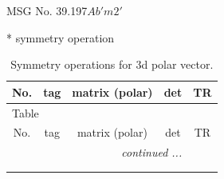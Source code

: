 \documentclass[fleqn,8pt]{jsarticle}
\begin{document}
\setcounter{MaxMatrixCols}{32}

\renewcommand{\tablename}{Table~}
\renewcommand{\figurename}{Figure~}
\begin{center}
\LARGE
MSG No. 39.197\quad$Ab'm2'$
\end{center}
* symmetry operation
\renewcommand{\arraystretch}{1.3}
\begin{longtable}{ccccc}
\caption{Symmetry operations for 3d polar vector.}
 \\
 \hline \hline
No. & tag & matrix (polar) & det & TR \\ \hline \endfirsthead

\multicolumn{4}{l}{\tablename\ \thetable{}} \\
 \hline \hline
No. & tag & matrix (polar) & det & TR \\ \hline \endhead

 \hline \hline
\multicolumn{4}{r}{\footnotesize\it continued ...} \\ \endfoot

 \hline \hline
\multicolumn{4}{r}{} \\ \endlastfoot


\end{longtable}
\end{document}
